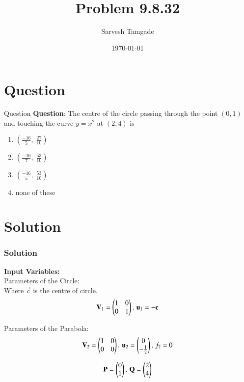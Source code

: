 \documentclass{beamer}
\title{Problem 9.8.32}
\author{Sarvesh Tamgade}
\date{\today}
\numberwithin{equation}{section}
\begin{document}
\begin{frame}
\titlepage
\end{frame}

\section{Question}
\begin{frame}{Question}
\textbf{Question}:
The centre of the circle passing through the point $(0,1)$ and touching the curve $y = x^2$ at $(2,4)$ is

\begin{enumerate}[label=(\alph*)]
\item $\left(\frac{-16}{5},\; \frac{27}{10}\right)$
\item $\left(\frac{-16}{7},\; \frac{53}{10}\right)$
\item $\left(\frac{-16}{5},\; \frac{53}{10}\right)$
\item none of these
\end{enumerate}

\end{frame}

\section{Solution}
\begin{frame}[fragile]
    \frametitle{Solution}
\textbf{Input Variables:  }\\
Parameters of the Circle:\\
Where $\vec{c}$ is the centre of circle.
\begin{equation}
\mathbf{V}_1 = \begin{pmatrix}1 & 0 \\ 0 & 1\end{pmatrix}, \, \mathbf{u}_1 = -\mathbf{c}
\end{equation}

Parameters of the Parabola:
\begin{equation}
\mathbf{V}_2 = \begin{pmatrix}1 & 0 \\ 0 & 0\end{pmatrix}, \, \mathbf{u}_2 = \begin{pmatrix}0 \\ -\frac{1}{2}\end{pmatrix}, \, f_2 = 0
\end{equation}

\begin{equation}
\mathbf{P} = \begin{pmatrix}0 \\ 1\end{pmatrix}, \, \mathbf{Q}= \begin{pmatrix}2 \\ 4\end{pmatrix}
\end{equation}
\end{frame}
\end{document}
